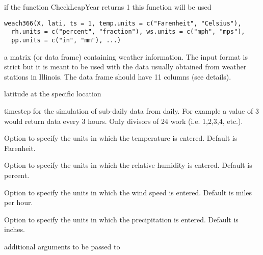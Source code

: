 \documentclass[letterpaper]{book}
\begin{document}
%
\begin{Description}\relax
if the function CheckLeapYear returns 1 this function will
be used
\end{Description}
%
\begin{Usage}
\begin{verbatim}
weach366(X, lati, ts = 1, temp.units = c("Farenheit", "Celsius"),
  rh.units = c("percent", "fraction"), ws.units = c("mph", "mps"),
  pp.units = c("in", "mm"), ...)
\end{verbatim}
\end{Usage}
%
\begin{Arguments}
\begin{ldescription}
\item[\code{X}] a matrix (or data frame) containing weather
information.  The input format is strict but it is meant
to be used with the data usually obtained from weather
stations in Illinois. The data frame should have 11
columns (see details).

\item[\code{lati}] latitude at the specific location

\item[\code{ts}] timestep for the simulation of sub-daily data
from daily. For example a value of 3 would return data
every 3 hours. Only divisors of 24 work (i.e. 1,2,3,4,
etc.).

\item[\code{temp.units}] Option to specify the units in which
the temperature is entered. Default is Farenheit.

\item[\code{rh.units}] Option to specify the units in which the
relative humidity is entered. Default is percent.

\item[\code{ws.units}] Option to specify the units in which the
wind speed is entered. Default is miles per hour.

\item[\code{pp.units}] Option to specify the units in which the
precipitation is entered. Default is inches.

\item[\code{list()}] additional arguments to be passed to
\end{ldescription}
\end{Arguments}
\end{document}
